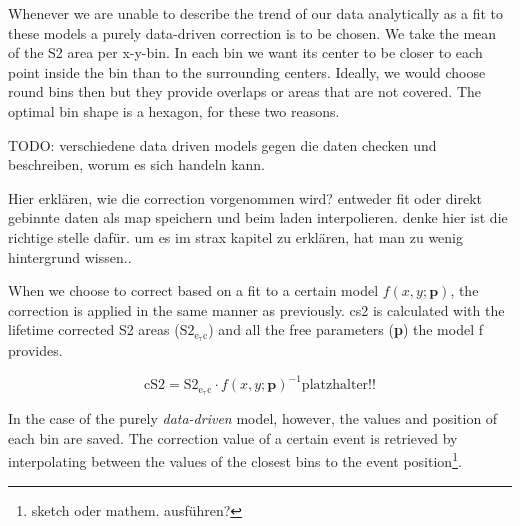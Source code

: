 Whenever we are unable to describe the trend of our data analytically as a fit to these models a purely data-driven correction is to be chosen.
We take the mean of the S2 area per x-y-bin.
In each bin we want its center to be closer to each point inside the bin than to the surrounding centers.
Ideally, we would choose round bins then but they provide overlaps or areas that are not covered.
The optimal bin shape is a hexagon, for these two reasons.

TODO: verschiedene data driven models gegen die daten checken und beschreiben, worum es sich handeln kann.


Hier erklären, wie die correction vorgenommen wird? entweder fit oder direkt gebinnte daten als map speichern und beim laden interpolieren. denke hier ist die richtige stelle dafür. um es im strax kapitel zu erklären, hat man zu wenig hintergrund wissen..

When we choose to correct based on a fit to a certain model $ f\left( x,y;\mathbf{p} \right) $, the correction is applied in the same manner as previously. \gls{cs2} is calculated with the lifetime corrected S2 areas ($ \mathrm{S2_\mathrm{e_\tau c}} $) and all the free parameters (\textbf{p}) the model f provides.

\begin{equation} %
    \mathrm{cS2} = \mathrm{S2_\mathrm{e_\tau c}} \cdot f\left( x,y; \mathbf{p} \right)^{-1} \mathrm{platzhalter!!}
    \label{eq:cs2}
\end{equation}

In the case of the purely \emph{data-driven} model, however, the values and position of each bin are saved.
The correction value of a certain event is retrieved by interpolating between the values of the closest bins to the event position\footnote{sketch oder mathem. ausführen?}.


